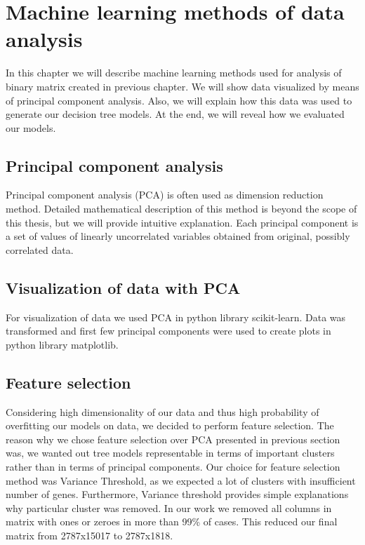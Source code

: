 \chapter{Machine learning methods of data analysis}
In this chapter we will describe machine learning methods used for analysis of binary matrix created in previous chapter. We will show data visualized by means of principal component analysis. Also, we will explain how this data was used to generate our decision tree models. At the end, we will reveal how we evaluated our models.

\section{Principal component analysis}
Principal component analysis (PCA) is often used as dimension reduction method.
Detailed mathematical description of this method is beyond the scope of this thesis, but we will provide intuitive explanation.
Each principal component is a set of values of linearly uncorrelated variables obtained from original, possibly correlated data.

\section{Visualization of data with PCA}
For visualization of data we used PCA in python library scikit-learn.
Data was transformed and first few principal components were used to create plots in python library matplotlib.

\section{Feature selection}
Considering high dimensionality of our data and thus high probability of overfitting our models on data, we decided to perform feature selection.
The reason why we chose feature selection over PCA presented in previous section was, we wanted out tree models representable in terms of important clusters rather than in terms of principal components.
Our choice for feature selection method was Variance Threshold, as we expected a lot of clusters with insufficient number of genes.
Furthermore, Variance threshold provides simple explanations why particular cluster was removed.
In our work we removed all columns in matrix with ones or zeroes in more than 99\% of cases.
This reduced our final matrix from 2787x15017 to 2787x1818.


